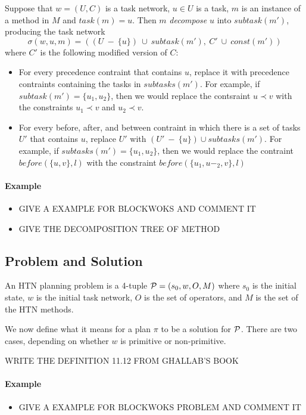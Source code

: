 Suppose that $w = (U,C)$ is a task network, $u \in U$ is a task, $m$ is an instance of a method in $M$ and $task(m) = u$. Then $m$ {\em decompose} $u$ into $subtask(m')$, producing the task network
$$
\sigma(w,u,m) = ((U \ - \ \{u\}) \ \cup \ subtask(m'), \ C' \ \cup \ const(m'))
$$
where $C'$ is the following modified version of $C$:
\begin{itemize}
\item For every precedence contraint that contains $u$, replace it with precedence contraints containing the tasks in $subtasks(m')$. For example, if $subtask(m') = \{u_1, u_2\}$, then we would replace the contsraint $u \prec v$ with the constraints $u_1 \prec v$ and $u_2 \prec v$.
\item For every before, after, and between contraint in which there is a set of tasks $U'$ that contains $u$, replace $U'$ with $(U' \ - \ \{u\}) \cup subtasks(m')$. For example, if $subtasks(m') = \{u_1, u_2\}$, then we would replace the contraint $before(\{u, v\}, l)$ with the constraint $before(\{u_1, u-_2, v\}, l)$ 
\end{itemize}

\paragraph*{Example} 
\begin{itemize}
\item GIVE A EXAMPLE FOR BLOCKWOKS AND COMMENT IT
\item GIVE THE DECOMPOSITION TREE OF METHOD
\end{itemize}

\subsection{Problem and Solution}

An HTN planning problem is a 4-tuple ${\cal{P}} = (s_0, w, O, M)$ where $s_0$ is the initial state, $w$ is the initial task network, $O$ is the set of operators, and $M$ is the set of the HTN methods.

We now define what it means for a plan $\pi$ to be a solution for $\cal{P}$. There are two cases, depending on whether $w$ is primitive or non-primitive.

WRITE THE DEFINITION 11.12 FROM GHALLAB'S BOOK

\paragraph*{Example} 
\begin{itemize}
\item GIVE A EXAMPLE FOR BLOCKWOKS PROBLEM AND COMMENT IT
\end{itemize}

